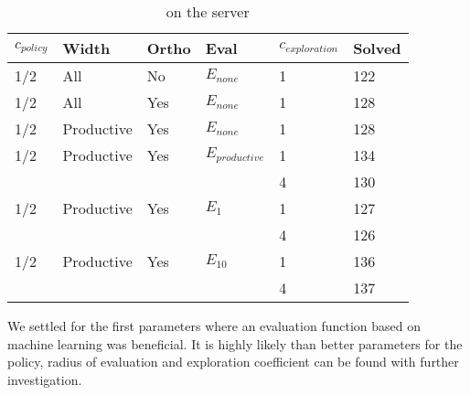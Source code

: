 \documentclass[runningheads,a4paper,draft]{svjour3}
\newcommand{\ra}[1]{\renewcommand{\arraystretch}{#1}}
\begin{document}

\begin{table}[ht]
\centering\ra{1.3}
\small
\begin{tabular}{llllll}
\toprule
  $c_{policy}$ & Width & Ortho & Eval & $c_{exploration}$ & Solved \\
\midrule
 1/2 & All & No & $E_{none}$ & 1 & 122\\
 1/2 & All & Yes & $E_{none}$ & 1 & 128\\
 1/2 & Productive & Yes & $E_{none}$ & 1 & 128\\
 1/2 & Productive & Yes & $E_{productive}$ & 1 & 134\\ 
 &  & &  & 4 & 130\\
 1/2 & Productive & Yes & $E_1$ & 1 & 127\\ 
 & & & & 4 & 126\\ 
 1/2 & Productive & Yes & $E_{10}$ & 1 & 136\\ 
 & & & & 4 & 137\\ 
\bottomrule
\end{tabular}
\caption{\label{tab:learning} on the server}
\end{table}

We settled for the first parameters where an evaluation function based on 
machine learning was beneficial. It is highly likely than better parameters for 
the policy, radius of evaluation and exploration coefficient can be found with 
further investigation.

%
\end{document}

